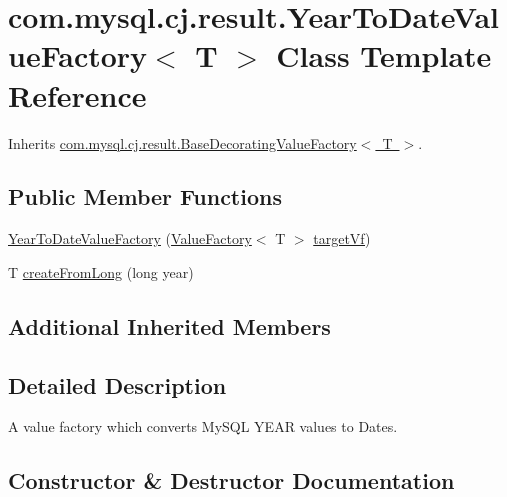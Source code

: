 \hypertarget{classcom_1_1mysql_1_1cj_1_1result_1_1_year_to_date_value_factory}{}\section{com.\+mysql.\+cj.\+result.\+Year\+To\+Date\+Value\+Factory$<$ T $>$ Class Template Reference}
\label{classcom_1_1mysql_1_1cj_1_1result_1_1_year_to_date_value_factory}


Inherits \mbox{\hyperlink{classcom_1_1mysql_1_1cj_1_1result_1_1_base_decorating_value_factory}{com.\+mysql.\+cj.\+result.\+Base\+Decorating\+Value\+Factory$<$ T $>$}}.

\subsection*{Public Member Functions}
\begin{DoxyCompactItemize}
\item 
\mbox{\hyperlink{classcom_1_1mysql_1_1cj_1_1result_1_1_year_to_date_value_factory_ac56c5348fac345d1878baacb0f8ab999}{Year\+To\+Date\+Value\+Factory}} (\mbox{\hyperlink{interfacecom_1_1mysql_1_1cj_1_1result_1_1_value_factory}{Value\+Factory}}$<$ T $>$ \mbox{\hyperlink{classcom_1_1mysql_1_1cj_1_1result_1_1_base_decorating_value_factory_a64c2c62bd9906ec3af7fc62e58bf34b3}{target\+Vf}})
\item 
T \mbox{\hyperlink{classcom_1_1mysql_1_1cj_1_1result_1_1_year_to_date_value_factory_a3da51ee200c8868b0a8e2c84cecdb8c1}{create\+From\+Long}} (long year)
\end{DoxyCompactItemize}
\subsection*{Additional Inherited Members}


\subsection{Detailed Description}
A value factory which converts My\+S\+QL Y\+E\+AR values to Dates. 

\subsection{Constructor \& Destructor Documentation}
\mbox{\label{classcom_1_1mysql_1_1cj_1_1result_1_1_year_to_date_value_factory_ac56c5348fac345d1878baacb0f8ab999}} 
